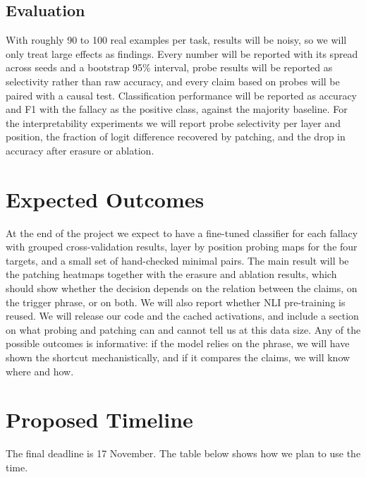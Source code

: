 \documentclass[11pt,a4paper]{article}
\begin{document}
\subsection{Evaluation}

With roughly 90 to 100 real examples per task, results will be noisy, so we will only treat large effects as findings. Every number will be reported with its spread across seeds and a bootstrap 95\% interval, probe results will be reported as selectivity rather than raw accuracy, and every claim based on probes will be paired with a causal test. Classification performance will be reported as accuracy and F1 with the fallacy as the positive class, against the majority baseline. For the interpretability experiments we will report probe selectivity per layer and position, the fraction of logit difference recovered by patching, and the drop in accuracy after erasure or ablation.

\section{Expected Outcomes}

At the end of the project we expect to have a fine-tuned classifier for each fallacy with grouped cross-validation results, layer by position probing maps for the four targets, and a small set of hand-checked minimal pairs. The main result will be the patching heatmaps together with the erasure and ablation results, which should show whether the decision depends on the relation between the claims, on the trigger phrase, or on both. We will also report whether NLI pre-training is reused. We will release our code and the cached activations, and include a section on what probing and patching can and cannot tell us at this data size. Any of the possible outcomes is informative: if the model relies on the phrase, we will have shown the shortcut mechanistically, and if it compares the claims, we will know where and how.

\section{Proposed Timeline}

The final deadline is 17 November. The table below shows how we plan to use the time.
\end{document}

